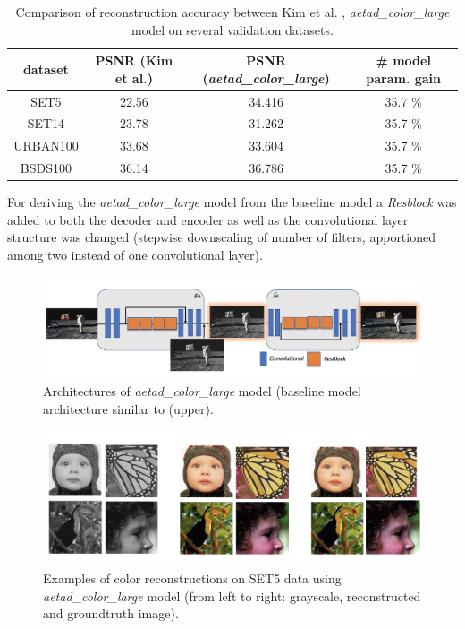 \begin{table}[!htbp]
	\begin{center}
	\begin{tabular}{c|c|c|c}
	dataset & PSNR (Kim et al.) & PSNR (\textit{aetad\_color\_large})
	& \# model param. gain \\
	\hline
    SET5 & 22.56 & 34.416 & 35.7 \%\\
	SET14 & 23.78 & 31.262 & 35.7 \% \\
	URBAN100 & 33.68 & 33.604 & 35.7 \% \\
	BSDS100 & 36.14 & 36.786 & 35.7 \% \\
	\end{tabular}
	\caption{Comparison of reconstruction accuracy between Kim et al. \cite{TAID}, \textit{aetad\_color\_large} model on several validation datasets. }
	\label{table:icperformance}
	\end{center}
\end{table}

For deriving the \textit{aetad\_color\_large} model from the baseline model a \textit{Resblock} was added to both the decoder and encoder as well as the convolutional layer structure was changed (stepwise downscaling of number of filters, apportioned among two instead of one convolutional layer). 

\begin{figure}[!htbp]
	\centering
	\includegraphics[width=12cm]{figures/architecture_color_large.png}
	\caption{Architectures of \textit{aetad\_color\_large} model (baseline model architecture  similar to (upper).}
  \label{fig:final_model_ic}
\end{figure}

\begin{figure}[!htbp]
	\centering
	\includegraphics[width=16cm]{figures/examples_ic.png}
	\caption{Examples of color reconstructions on SET5 data using \textit{aetad\_color\_large} model (from left to right: grayscale, reconstructed and groundtruth image). }
  \label{fig:examples_ic}
\end{figure}

